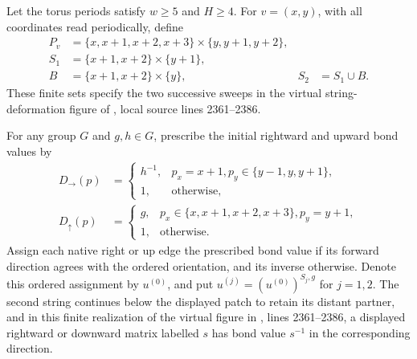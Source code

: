 \begin{definition}%
    \label{def:peps_torus_swept_string_patch}
    \leanok
    Let the torus periods satisfy $w\geq5$ and $H\geq4$.
    For $v=(x,y)$, with all coordinates read periodically, define
    \begin{align}
        P_v & =\{x,x+1,x+2,x+3\}\times\{y,y+1,y+2\},                     \\
        S_1 & =\{x+1,x+2\}\times\{y+1\},                                 \\
        B   & =\{x+1,x+2\}\times\{y\},               & S_2 & =S_1\cup B.
    \end{align}
    These finite sets specify the two successive sweeps in the virtual
    string-deformation figure of \cite[Section~6.6]{Schuch2010PEPS},
    local source lines 2361--2386.
\end{definition}

\begin{definition}%
    \label{def:peps_torus_swept_string_assignment}
    \leanok
    For any group $G$ and $g,h\in G$, prescribe the initial rightward
    and upward bond values by
    \begin{align}
        D_{\rightarrow}(p) & =
        \begin{cases}
            h^{-1}, & p_x=x+1, p_y\in\{y-1,y,y+1\}, \\
            1,      & \text{otherwise},
        \end{cases} \\
        D_{\uparrow}(p)    & =
        \begin{cases}
            g, & p_x\in\{x,x+1,x+2,x+3\}, p_y=y+1, \\
            1, & \text{otherwise}.
        \end{cases}
        \label{eq:peps_swept_string_initial}
    \end{align}
    Assign each native right or up edge the prescribed bond value if
    its forward direction agrees with the ordered orientation, and its
    inverse otherwise. Denote this ordered assignment by $u^{(0)}$,
    and put $u^{(j)}=(u^{(0)})^{S_j,g}$ for $j=1,2$.
    The second string continues below the displayed patch to retain
    its distant partner, and in this finite realization of the virtual figure in
    \cite[Section~6.6]{Schuch2010PEPS}, lines 2361--2386, a displayed
    rightward or downward matrix labelled $s$ has bond value $s^{-1}$ in the
    corresponding direction.
\end{definition}

